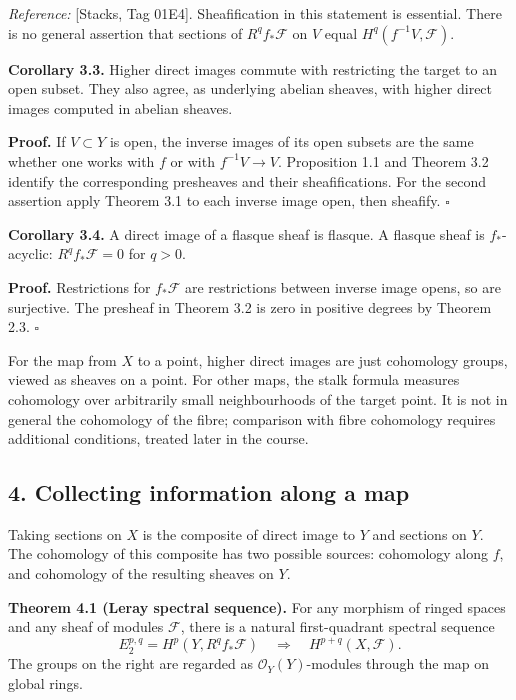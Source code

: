 \documentclass[11pt]{article}
\begin{document}
\emph{Reference:} {[}Stacks, Tag 01E4{]}. Sheafification in this
statement is essential. There is no general assertion that sections of
\(R^qf_*\mathcal F\) on \(V\) equal \(H^q(f^{-1}V,\mathcal F)\).

\textbf{Corollary 3.3.} Higher direct images commute with restricting
the target to an open subset. They also agree, as underlying abelian
sheaves, with higher direct images computed in abelian sheaves.

\textbf{Proof.} If \(V\subset Y\) is open, the inverse images of its
open subsets are the same whether one works with \(f\) or with
\(f^{-1}V\to V\). Proposition 1.1 and Theorem 3.2 identify the
corresponding presheaves and their sheafifications. For the second
assertion apply Theorem 3.1 to each inverse image open, then sheafify.
\(\square\)

\textbf{Corollary 3.4.} A direct image of a flasque sheaf is flasque. A
flasque sheaf is \(f_*\)-acyclic: \(R^qf_*\mathcal F=0\) for \(q>0\).

\textbf{Proof.} Restrictions for \(f_*\mathcal F\) are restrictions
between inverse image opens, so are surjective. The presheaf in Theorem
3.2 is zero in positive degrees by Theorem 2.3. \(\square\)

For the map from \(X\) to a point, higher direct images are just
cohomology groups, viewed as sheaves on a point. For other maps, the
stalk formula measures cohomology over arbitrarily small neighbourhoods
of the target point. It is not in general the cohomology of the fibre;
comparison with fibre cohomology requires additional conditions, treated
later in the course.

\subsection{4. Collecting information along a
map}\label{collecting-information-along-a-map}

Taking sections on \(X\) is the composite of direct image to \(Y\) and
sections on \(Y\). The cohomology of this composite has two possible
sources: cohomology along \(f\), and cohomology of the resulting sheaves
on \(Y\).

\textbf{Theorem 4.1 (Leray spectral sequence).} For any morphism of
ringed spaces and any sheaf of modules \(\mathcal F\), there is a
natural first-quadrant spectral sequence \[
E_2^{p,q}=H^p(Y,R^qf_*\mathcal F)
\quad\Longrightarrow\quad H^{p+q}(X,\mathcal F).
\] The groups on the right are regarded as \(\mathcal O_Y(Y)\)-modules
through the map on global rings.
\end{document}
